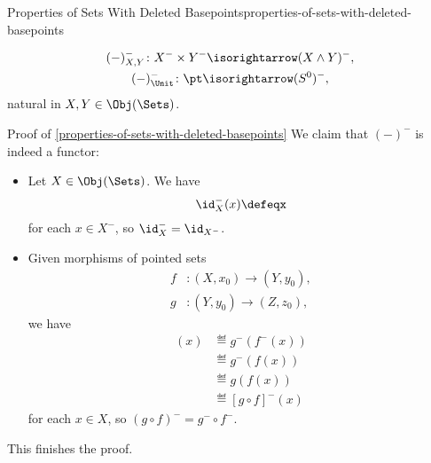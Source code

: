 \begin{proposition}{Properties of Sets With Deleted Basepoints}{properties-of-sets-with-deleted-basepoints}
\begin{enumerate}
            \[
                \begin{gathered}
                    (-)^{-}_{X,Y}   \colon X^{-}\times Y^{-} \isorightarrow (X\wedge Y)^{-},\\
                    (-)^{-}_{\Unit} \colon \pt               \isorightarrow (S^{0})^{-},
                \end{gathered}
            \]%
            natural in $X,Y\in\Obj(\Sets)$.
    \end{enumerate}
\end{proposition}
\begin{Proof}{Proof of \cref{properties-of-sets-with-deleted-basepoints}}%
    We claim that $(-)^{-}$ is indeed a functor:
    \begin{itemize}
        \item{}Let $X\in\Obj(\Sets)$. We have
            \[
                \id^{-}_{X}(x)%
                \defeq%
                x
            \]%
            for each $x\in X^{-}$, so $\id^{-}_{X}=\id_{X^{-}}$.
        \item{}Given morphisms of pointed sets
            \begin{align*}
                f &\colon (X,x_{0}) \to (Y,y_{0}),\\
                g &\colon (Y,y_{0}) \to (Z,z_{0}),
            \end{align*}
            we have
            \begin{align*}
                [g^{-}\circ f^{-}](x) &\eqdef g^{-}(f^{-}(x))\\
                                      &\eqdef g^{-}(f(x))\\
                                      &\eqdef g(f(x))\\
                                      &\eqdef [g\circ f]^{-}(x)%
            \end{align*}
            for each $x\in X$, so $(g\circ f)^{-}=g^{-}\circ f^{-}$.
    \end{itemize}
    This finishes the proof.


\end{Proof}
